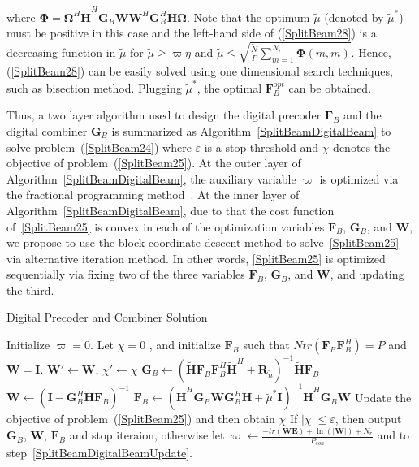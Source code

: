 \documentclass[11pt,draftcls,onecolumn]{IEEEtran}
\begin{document}
where $\bm{\Phi}=\bm{\Omega}^{H}\widetilde{\bm{H}}^{H}\bm{G}_{B}\bm{W}\bm{W}^{H}\bm{G}_{B}^{H}\widetilde{\bm{H}}\bm{\Omega}$. Note that the optimum $\widetilde{\mu}$ (denoted by $\widetilde{\mu}^{*}$) must be positive in this case and the left-hand side of (\ref{SplitBeam28}) is a decreasing function in $\widetilde{\mu}$ for $\widetilde{\mu}\geq \varpi\eta$ and $\widetilde{\mu}\leqslant \sqrt{\frac{\widetilde{N}}{P}\sum\limits_{m=1}^{N_{r}}\bm{\Phi}\left(m,m\right)}$. Hence, (\ref{SplitBeam28}) can be easily solved using one dimensional search techniques, such as bisection method. Plugging $\widetilde{\mu}^{*}$, the optimal $\bm{F}_{B}^{opt}$ can be obtained.

Thus, a two layer algorithm used to design the digital precoder $\bm{F}_{B}$ and the digital combiner $\bm{G}_{B}$ is summarized as Algorithm~\ref{SplitBeamDigitalBeam} to solve problem~(\ref{SplitBeam24}) where $\varepsilon$ is a stop threshold and $\chi$ denotes the objective of problem~(\ref{SplitBeam25}). At the outer layer of Algorithm~\ref{SplitBeamDigitalBeam}, the auxiliary variable $\varpi$ is optimized via the fractional programming method~\cite{JstorJagan1966,JstorDink1967}. At the inner layer of Algorithm~\ref{SplitBeamDigitalBeam}, due to that the cost function of~\eqref{SplitBeam25} is convex in each of the optimization variables $\bm{F}_{B}$, $\bm{G}_{B}$, and $\bm{W}$, we propose to use the block coordinate descent method to solve~\eqref{SplitBeam25} via alternative iteration method. In other words, \eqref{SplitBeam25} is optimized sequentially via fixing two of the three variables $\bm{F}_{B}$, $\bm{G}_{B}$, and $\bm{W}$, and updating the third.
\begin{algorithm}
\caption{Digital Precoder and Combiner Solution}\label{SplitBeamDigitalBeam}
\begin{algorithmic}[1]
\STATE Initialize $\varpi=0$.
\STATE Let $\chi=0$ , and initialize $\bm{F}_{B}$ such that $\widetilde{N}tr\left(\bm{F}_{B}\bm{F}_{B}^{H}\right)=P$ and $\bm{W}=\bm{I}$.\label{SplitBeamDigitalBeamUpdate}
\REPEAT
\STATE $\bm{W}'\leftarrow\bm{W}$, $\chi'\leftarrow\chi$
\STATE $\bm{G}_{B}\leftarrow\left(\widetilde{\bm{H}}\bm{F}_{B}\bm{F}_{B}^{H}\widetilde{\bm{H}}^{H}+
\bm{R}_{\widetilde{n}}\right)^{-1}\widetilde{\bm{H}}\bm{F}_{B}$
\STATE $\bm{W}\leftarrow\left(\bm{I}-\bm{G}_{B}^{H}\widetilde{\bm{H}}\bm{F}_{B}\right)^{-1}$
\STATE $\bm{F}_{B}\leftarrow\left(\widetilde{\bm{H}}^{H}\bm{G}_{B}\bm{W}\bm{G}_{B}^{H}
\widetilde{\bm{H}}+\widetilde{\mu}^{*}\bm{I}\right)^{-1}\widetilde{\bm{H}}^{H}\bm{G}_{B}\bm{W}$
\STATE Update the objective of problem~(\ref{SplitBeam25})  and then obtain $\chi$
\STATE If $\left|\chi\right|\leq\varepsilon$, then output $\bm{G}_{B}$, $\bm{W}$, $\bm{F}_{B}$ and stop iteraion, otherwise let $\varpi\leftarrow \frac{-tr\left(\bm{W}\bm{E}\right)+\ln\left(\left|\bm{W}\right|\right)+N_{r}}{P_{con}}$ and to step~\ref{SplitBeamDigitalBeamUpdate}.
\end{algorithmic}
\end{algorithm}
\end{document}
